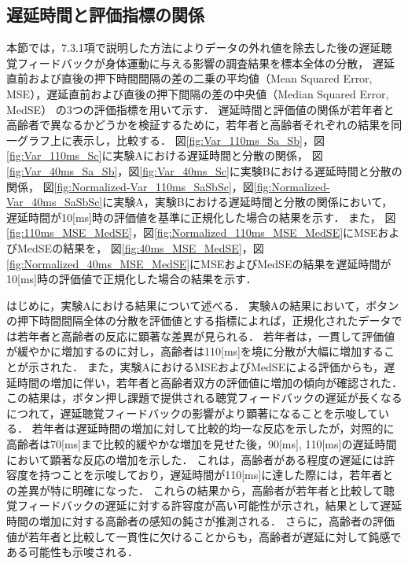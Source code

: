 \subsection{遅延時間と評価指標の関係}
本節では，7.3.1項で説明した方法によりデータの外れ値を除去した後の遅延聴覚フィードバックが身体運動に与える影響の調査結果を標本全体の分散，
遅延直前および直後の押下時間間隔の差の二乗の平均値（Mean Squared Error, MSE），遅延直前および直後の押下間隔の差の中央値（Median Squared Error, MedSE）
の3つの評価指標を用いて示す．
遅延時間と評価値の関係が若年者と高齢者で異なるかどうかを検証するために，若年者と高齢者それぞれの結果を同一グラフ上に表示し，比較する．
図\ref{fig:Var_110ms_Sa_Sb}，図\ref{fig:Var_110ms_Sc}に実験Aにおける遅延時間と分散の関係，
図\ref{fig:Var_40ms_Sa_Sb}，図\ref{fig:Var_40ms_Sc}に実験Bにおける遅延時間と分散の関係，
図\ref{fig:Normalized-Var_110ms_SaSbSc}，図\ref{fig:Normalized-Var_40ms_SaSbSc}に実験A，実験Bにおける遅延時間と分散の関係において，遅延時間が10[ms]時の評価値を基準に正規化した場合の結果を示す．
また，
図\ref{fig:110ms_MSE_MedSE}，図\ref{fig:Normalized_110ms_MSE_MedSE}にMSEおよびMedSEの結果を，
図\ref{fig:40ms_MSE_MedSE}，図\ref{fig:Normalized_40ms_MSE_MedSE}にMSEおよびMedSEの結果を遅延時間が10[ms]時の評価値で正規化した場合の結果を示す．

はじめに，実験Aにおける結果について述べる．
実験Aの結果において，ボタンの押下時間間隔全体の分散を評価値とする指標によれば，正規化されたデータでは若年者と高齢者の反応に顕著な差異が見られる．
若年者は，一貫して評価値が緩やかに増加するのに対し，高齢者は110[ms]を境に分散が大幅に増加することが示された．
また，実験AにおけるMSEおよびMedSEによる評価からも，遅延時間の増加に伴い，若年者と高齢者双方の評価値に増加の傾向が確認された．
この結果は，ボタン押し課題で提供される聴覚フィードバックの遅延が長くなるにつれて，遅延聴覚フィードバックの影響がより顕著になることを示唆している．
若年者は遅延時間の増加に対して比較的均一な反応を示したが，対照的に高齢者は70[ms]まで比較的緩やかな増加を見せた後，90[ms], 110[ms]の遅延時間において顕著な反応の増加を示した．
これは，高齢者がある程度の遅延には許容度を持つことを示唆しており，遅延時間が110[ms]に達した際には，若年者との差異が特に明確になった．
これらの結果から，高齢者が若年者と比較して聴覚フィードバックの遅延に対する許容度が高い可能性が示され，結果として遅延時間の増加に対する高齢者の感知の鈍さが推測される．
さらに，高齢者の評価値が若年者と比較して一貫性に欠けることからも，高齢者が遅延に対して鈍感である可能性も示唆される．

